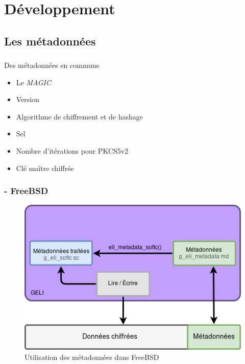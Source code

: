 \section{Développement}

\subsection{Les métadonnées}

\begin{frame}
	\frametitle{\insertsubsectionhead{}}
	\begin{block}{Des métadonnées en communs}
		\begin{itemize}
		\item Le \textit{MAGIC}
		\item Version
		\item Algorithme de chiffrement et de hashage
		\item Sel
		\item Nombre d'itérations pour PKCS5v2
		\item Clé maître chiffrée
		\end{itemize}
	\end{block}
\end{frame}

\begin{frame}
	\frametitle{\insertsubsectionhead{} - \textbf{FreeBSD}}
	\begin{figure}
		\includegraphics[width=.8\textwidth]{developpement/utilisation_metadonnee}
		\caption{Utilisation des métadonnées dans FreeBSD}
	\end{figure}
\end{frame}

